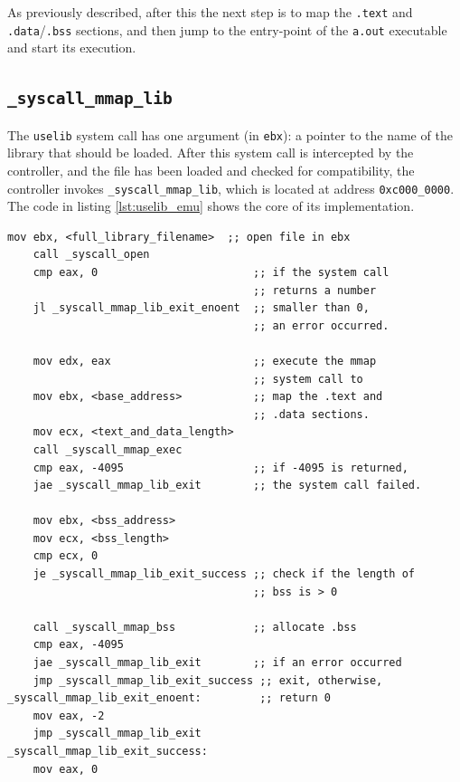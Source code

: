 \documentclass[draft,final]{vutinfth} %
\begin{document}
As previously described, after this the next step is to map the \texttt{.text} and \texttt{.data}/\texttt{.bss} sections, and then jump to the entry-point of the \texttt{a.out} executable and start its execution.

\subsection{\texttt{\_syscall\_mmap\_lib}}

The \texttt{uselib} system call has one argument (in \texttt{ebx}\cite{SyscallRef}): a pointer to the name of the library that should be loaded. After this system call is intercepted by the controller, and the file has been loaded and checked for compatibility, the controller invokes \texttt{\_syscall\_mmap\_lib}, which is located at address \texttt{0xc000\_0000}. The code in listing \ref{lst:uselib_emu} shows the core of its implementation.

\begin{lstlisting}[language={[x86masm]Assembler}, caption={Assembly used to emulate the behavior of a \texttt{uselib} system call.}, label={lst:uselib_emu}]
    mov ebx, <full_library_filename>  ;; open file in ebx
    call _syscall_open
    cmp eax, 0                        ;; if the system call
                                      ;; returns a number
    jl _syscall_mmap_lib_exit_enoent  ;; smaller than 0,
                                      ;; an error occurred.

    mov edx, eax                      ;; execute the mmap
                                      ;; system call to
    mov ebx, <base_address>           ;; map the .text and
                                      ;; .data sections.
    mov ecx, <text_and_data_length>
    call _syscall_mmap_exec
    cmp eax, -4095                    ;; if -4095 is returned,
    jae _syscall_mmap_lib_exit        ;; the system call failed.

    mov ebx, <bss_address>
    mov ecx, <bss_length>
    cmp ecx, 0
    je _syscall_mmap_lib_exit_success ;; check if the length of
                                      ;; bss is > 0

    call _syscall_mmap_bss            ;; allocate .bss
    cmp eax, -4095
    jae _syscall_mmap_lib_exit        ;; if an error occurred
    jmp _syscall_mmap_lib_exit_success ;; exit, otherwise,
_syscall_mmap_lib_exit_enoent:         ;; return 0
    mov eax, -2
    jmp _syscall_mmap_lib_exit
_syscall_mmap_lib_exit_success:
    mov eax, 0
\end{lstlisting}
\end{document}
